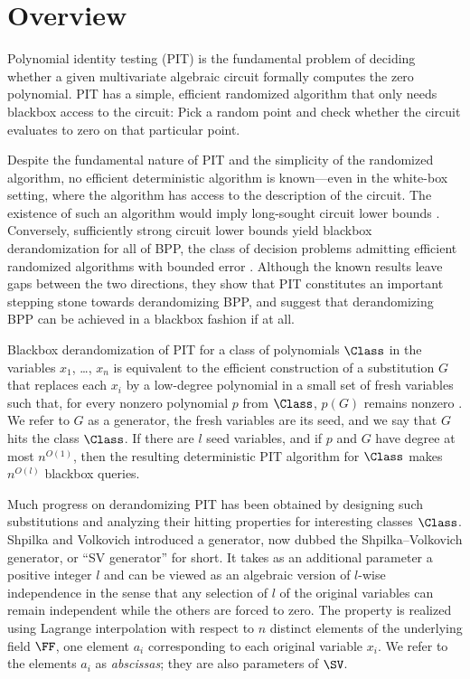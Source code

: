 \documentclass{toc}
\begin{document}
%
%
%


%
%
%

\section{Overview}
\label{s.intro}

Polynomial identity testing (PIT) is the fundamental problem of deciding
whether a given multivariate algebraic circuit formally computes the zero
polynomial.
PIT has a simple, efficient randomized algorithm that only needs blackbox
access to the circuit:
Pick a random point and check whether the circuit evaluates to zero on that
particular point.

Despite the fundamental nature of PIT and the simplicity of the randomized
algorithm,
no efficient deterministic algorithm is known---even in the white-box setting,
where the algorithm has access to the description of the circuit.
The existence of such an algorithm would imply long-sought circuit lower
bounds \cite{HeintzSchnorr1980, Agrawal2005, KabanetsImpagliazzo2004}.
Conversely, sufficiently strong circuit lower bounds yield blackbox
derandomization for all of BPP,
the class of decision problems admitting efficient randomized algorithms with
bounded error \cite{NisanWigderson1994,ImpagliazzoWigderson1997}.
Although the known results leave gaps between the two directions, they 
show that PIT constitutes an important stepping stone towards derandomizing BPP, and 
suggest that derandomizing BPP can be achieved in a blackbox fashion if at all.

Blackbox derandomization of PIT for a class of polynomials $\Class$ in the
variables \(x_1\), \ldots, \(x_n\) is equivalent to the efficient
construction of a substitution $G$ that replaces each \(x_i\) by a
low-degree polynomial in a small set of fresh variables
such that, for every nonzero polynomial $p$ from $\Class$,
$p(G)$ remains nonzero {\cite[Lemma 4.1]{ShpilkaYehudayoff2010}}.
We refer to \(G\) as a generator,
the fresh variables are its seed,
and we say that $G$ hits the class $\Class$.
If there are \(l\) seed variables,
and if $p$ and $G$ have degree at most $n^{O(1)}$,
then the resulting deterministic PIT algorithm for $\Class$ makes $n^{O(l)}$
blackbox queries.

Much progress on derandomizing PIT has been obtained by designing such substitutions and analyzing their hitting properties for interesting classes $\Class$.
Shpilka and Volkovich \cite{ShpilkaVolkovich2008} introduced a generator, now dubbed the Shpilka--Volkovich generator, or ``SV generator'' for short. It takes as an additional parameter a positive integer $l$ and can be viewed as an algebraic version of  $l$-wise independence in the sense that any selection of $l$ of the original variables can remain independent while the others are forced to zero. The property is realized using Lagrange interpolation with respect to $n$ distinct elements of the underlying field $\FF$, one element $a_i$ corresponding to each original variable $x_i$. We refer to the elements $a_i$ as \emph{abscissas}; they are also parameters of $\SV$.
\end{document}
